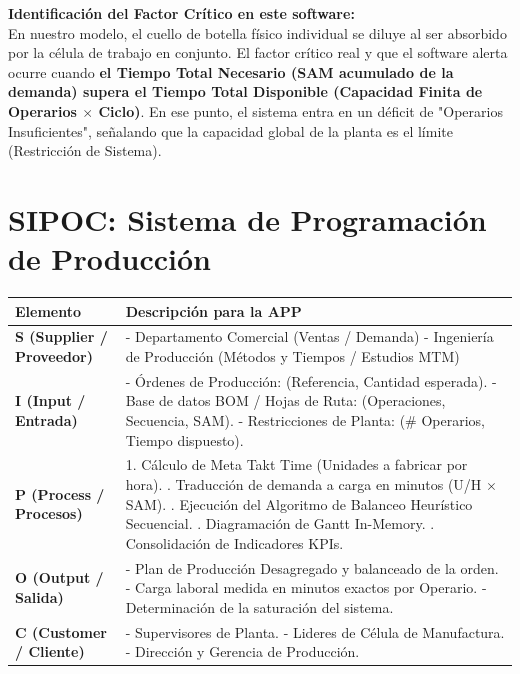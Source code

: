 \documentclass[12pt,a4paper]{article}
\begin{document}
\textbf{Identificación del Factor Crítico en este software:}\\
En nuestro modelo, el cuello de botella físico individual se diluye al ser absorbido por la célula de trabajo en conjunto. El factor crítico real y que el software alerta ocurre cuando \textbf{el Tiempo Total Necesario (SAM acumulado de la demanda) supera el Tiempo Total Disponible (Capacidad Finita de Operarios $\times$ Ciclo)}. En ese punto, el sistema entra en un déficit de "Operarios Insuficientes", señalando que la capacidad global de la planta es el límite (Restricción de Sistema).

\section{SIPOC: Sistema de Programación de Producción}

\begin{table}[h]
\centering
\begin{tabularx}{\textwidth}{|l|X|}
\hline
\textbf{Elemento} & \textbf{Descripción para la APP} \\ \hline
\textbf{S (Supplier / Proveedor)} & - Departamento Comercial (Ventas / Demanda) \newline - Ingeniería de Producción (Métodos y Tiempos / Estudios MTM) \\ \hline
\textbf{I (Input / Entrada)} & - Órdenes de Producción: (Referencia, Cantidad esperada). \newline - Base de datos BOM / Hojas de Ruta: (Operaciones, Secuencia, SAM). \newline - Restricciones de Planta: (\# Operarios, Tiempo dispuesto). \\ \hline
\textbf{P (Process / Procesos)} & 
1. Cálculo de Meta Takt Time (Unidades a fabricar por hora). \newline
2. Traducción de demanda a carga en minutos (U/H $\times$ SAM). \newline
3. Ejecución del Algoritmo de Balanceo Heurístico Secuencial. \newline
4. Diagramación de Gantt In-Memory. \newline
5. Consolidación de Indicadores KPIs. \\ \hline
\textbf{O (Output / Salida)} & - Plan de Producción Desagregado y balanceado de la orden. \newline - Carga laboral medida en minutos exactos por Operario. \newline - Determinación de la saturación del sistema. \\ \hline
\textbf{C (Customer / Cliente)} & - Supervisores de Planta. \newline - Lideres de Célula de Manufactura. \newline - Dirección y Gerencia de Producción. \\ \hline
\end{tabularx}
\end{table}
\end{document}
